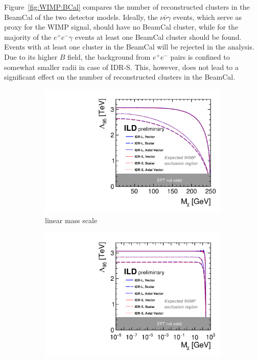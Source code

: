 Figure~\ref{fig:WIMP:BCal} compares the number of reconstructed clusters in the BeamCal of the two detector models. Ideally, the $\nu\bar{\nu}\gamma$ events, which serve as proxy for the WIMP signal, should have no BeamCal cluster, while for the majority of the $e^+e^-\gamma$ events at least one BeamCal cluster should be found. Events with at least one cluster in the BeamCal will be rejected in the analysis. Due to its higher $B$ field, the background from $e^+e^-$ pairs is confined to somewhat smaller radii in case of IDR-S. This, however, does not lead to a significant effect on the number of reconstructed clusters in the BeamCal.

\begin{figure}[htbp]
\begin{center}
\begin{subfigure}{0.49\hsize} 
 \includegraphics[width=\textwidth]{Performance/fig/sensitivity_H20_IDR.pdf}
 \caption{linear mass scale\label{fig:WIMP:limit:std}}
 \end{subfigure}
\begin{subfigure}{0.49\hsize} 
 \includegraphics[width=\textwidth]{Performance/fig/sensitivity_H20_IDR_logx.pdf}

\end{subfigure}
\end{center}
\end{figure}
